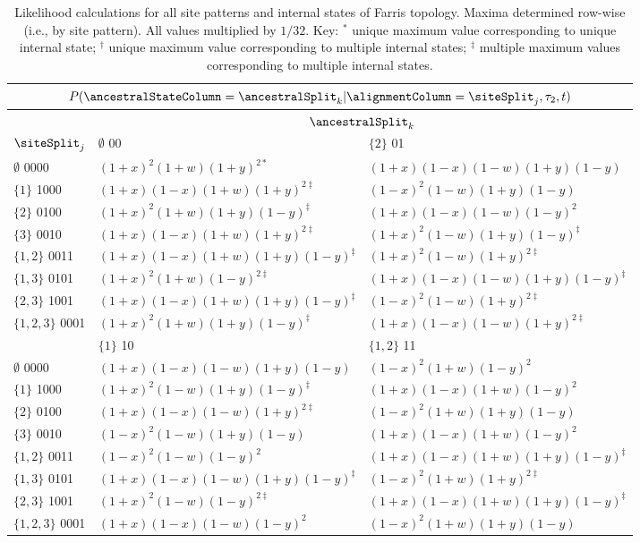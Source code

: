 \begin{table}
\begin{tabular}{|l|ll|}
    \hline
\multicolumn{3}{c}{$P(\ancestralStateColumn=\ancestralSplit_k|\alignmentColumn=\siteSplit_j,\tau_2,t)$}\\
\hline
& \multicolumn{2}{|c|}{$\ancestralSplit_k$}\\
    \hline
    $\siteSplit_j$    &$\emptyset$  00                              &$\{2\}$  01\\
    \hline
     $\emptyset$   0000&$(1+x)^2   (1+w)(1+y)^{2*}$           &$(1+x)(1-x)(1-w)(1+y)(1-y)$\\
     $\{1\}$       1000&$(1+x)(1-x)(1+w)(1+y)^{2\ddagger}$    &$(1-x)^2   (1-w)(1+y)(1-y)$\\
     $\{2\}$       0100&$(1+x)^2   (1+w)(1+y)(1-y)^{\ddagger}$&$(1+x)(1-x)(1-w)(1-y)^2$\\
     $\{3\}$       0010&$(1+x)(1-x)(1+w)(1+y)^{2\ddagger}$    &$(1+x)^2   (1-w)(1+y)(1-y)^{\ddagger}$\\
     $\{1,2\}$     0011&$(1+x)(1-x)(1+w)(1+y)(1-y)^{\ddagger}$&$(1+x)^2   (1-w)(1+y)^{2\ddagger}$\\
     $\{1,3\}$     0101&$(1+x)^2   (1+w)(1-y)^{2\ddagger}$    &$(1+x)(1-x)(1-w)(1+y)(1-y)^{\ddagger}$\\
     $\{2,3\}$     1001&$(1+x)(1-x)(1+w)(1+y)(1-y)^{\ddagger}$&$(1-x)^2   (1-w)(1+y)^{2\ddagger}$\\
     $\{1,2,3\}$   0001&$(1+x)^2   (1+w)(1+y)(1-y)^{\ddagger}$&$(1+x)(1-x)(1-w)(1+y)^{2\ddagger}$\\
    \hline
    \hline
    &$\{1\}$  10                           &$\{1,2\}$  11\\
    \hline
     $\emptyset$   0000&$(1+x)(1-x)(1-w)(1+y)(1-y)$             &$(1-x)^2   (1+w)(1-y)^2$\\
     $\{1\}$       1000&$(1+x)^2   (1-w)(1+y)(1-y)^{\ddagger}$  &$(1+x)(1-x)(1+w)(1-y)^2$\\
     $\{2\}$       0100&$(1+x)(1-x)(1-w)(1+y)^{2\ddagger}$      &$(1-x)^2   (1+w)(1+y)(1-y)$\\
     $\{3\}$       0010&$(1-x)^2   (1-w)(1+y)(1-y)$             &$(1+x)(1-x)(1+w)(1-y)^2$\\
     $\{1,2\}$     0011&$(1-x)^2   (1-w)(1-y)^2$                &$(1+x)(1-x)(1+w)(1+y)(1-y)^{\ddagger}$\\
     $\{1,3\}$     0101&$(1+x)(1-x)(1-w)(1+y)(1-y)^{\ddagger}$  &$(1-x)^2   (1+w)(1+y)^{2\ddagger}$\\
     $\{2,3\}$     1001&$(1+x)^2   (1-w)(1-y)^{2\ddagger}$      &$(1+x)(1-x)(1+w)(1+y)(1-y)^{\ddagger}$\\
     $\{1,2,3\}$   0001&$(1+x)(1-x)(1-w)(1-y)^2$                &$(1-x)^2   (1+w)(1+y)(1-y)$\\
\hline
\end{tabular}
\caption{Likelihood calculations for all site patterns and internal states of Farris topology.
Maxima determined row-wise (i.e., by site pattern).
All values multiplied by $1/32$.
Key: $^*$ unique maximum value corresponding to unique internal state; $^\dagger$ unique maximum value corresponding to multiple internal states; $^\ddagger$ multiple maximum values corresponding to multiple internal states.}
\label{tab:likelihoods}
\end{table}

